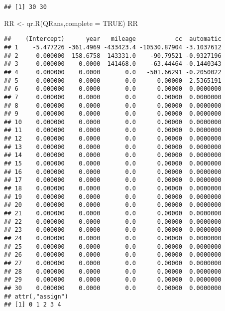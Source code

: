 \documentclass[
]{book}
\newenvironment{Shaded}{\begin{snugshade}}{\end{snugshade}}
\newcommand{\AttributeTok}[1]{\textcolor[rgb]{0.77,0.63,0.00}{#1}}
\newcommand{\ConstantTok}[1]{\textcolor[rgb]{0.00,0.00,0.00}{#1}}
\newcommand{\FunctionTok}[1]{\textcolor[rgb]{0.00,0.00,0.00}{#1}}
\newcommand{\NormalTok}[1]{#1}
\newcommand{\OtherTok}[1]{\textcolor[rgb]{0.56,0.35,0.01}{#1}}
\begin{document}
\begin{verbatim}
## [1] 30 30
\end{verbatim}

\begin{Shaded}
\begin{Highlighting}[]
\NormalTok{RR }\OtherTok{\textless{}{-}} \FunctionTok{qr.R}\NormalTok{(QRans,}\AttributeTok{complete =} \ConstantTok{TRUE}\NormalTok{) }
\NormalTok{RR}
\end{Highlighting}
\end{Shaded}

\begin{verbatim}
##    (Intercept)      year   mileage           cc  automatic
## 1    -5.477226 -361.4969 -433423.4 -10530.87904 -3.1037612
## 2     0.000000  158.6758  143331.0    -90.79521 -0.9327196
## 3     0.000000    0.0000  141468.0    -63.44464 -0.1440343
## 4     0.000000    0.0000       0.0   -501.66291 -0.2050022
## 5     0.000000    0.0000       0.0      0.00000  2.5365191
## 6     0.000000    0.0000       0.0      0.00000  0.0000000
## 7     0.000000    0.0000       0.0      0.00000  0.0000000
## 8     0.000000    0.0000       0.0      0.00000  0.0000000
## 9     0.000000    0.0000       0.0      0.00000  0.0000000
## 10    0.000000    0.0000       0.0      0.00000  0.0000000
## 11    0.000000    0.0000       0.0      0.00000  0.0000000
## 12    0.000000    0.0000       0.0      0.00000  0.0000000
## 13    0.000000    0.0000       0.0      0.00000  0.0000000
## 14    0.000000    0.0000       0.0      0.00000  0.0000000
## 15    0.000000    0.0000       0.0      0.00000  0.0000000
## 16    0.000000    0.0000       0.0      0.00000  0.0000000
## 17    0.000000    0.0000       0.0      0.00000  0.0000000
## 18    0.000000    0.0000       0.0      0.00000  0.0000000
## 19    0.000000    0.0000       0.0      0.00000  0.0000000
## 20    0.000000    0.0000       0.0      0.00000  0.0000000
## 21    0.000000    0.0000       0.0      0.00000  0.0000000
## 22    0.000000    0.0000       0.0      0.00000  0.0000000
## 23    0.000000    0.0000       0.0      0.00000  0.0000000
## 24    0.000000    0.0000       0.0      0.00000  0.0000000
## 25    0.000000    0.0000       0.0      0.00000  0.0000000
## 26    0.000000    0.0000       0.0      0.00000  0.0000000
## 27    0.000000    0.0000       0.0      0.00000  0.0000000
## 28    0.000000    0.0000       0.0      0.00000  0.0000000
## 29    0.000000    0.0000       0.0      0.00000  0.0000000
## 30    0.000000    0.0000       0.0      0.00000  0.0000000
## attr(,"assign")
## [1] 0 1 2 3 4
\end{verbatim}
\end{document}
